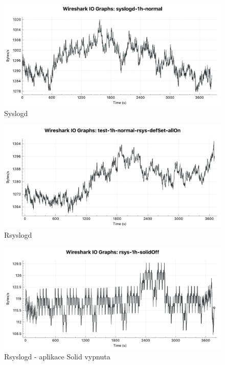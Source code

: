 \documentclass[thesis=B,czech]{FITthesis}[2012/06/26]
\begin{document}
\begin{figure}[H]
	\centering
	\includegraphics[scale=0.44]{images/test-1h-syslogd-default}
	\caption[Syslogd]{Syslogd}
\end{figure}

\begin{figure}[H]
	\centering
	\includegraphics[scale=0.44]{images/test-1h-rsys-default}
	\caption[Rsyslogd]{Rsyslogd}
\end{figure}

\begin{figure}[H]
	\centering
	\includegraphics[scale=0.44]{images/test-1h-rsys-solidoff}
	\caption[Rsyslogd - aplikace Solid vypnuta]{Rsyslogd - aplikace Solid vypnuta}
\end{figure}
\end{document}
